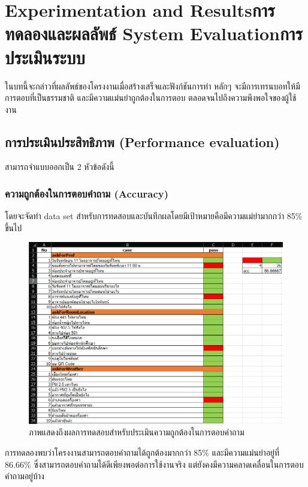 \chapter{\ifproject%
\ifenglish Experimentation and Results\else การทดลองและผลลัพธ์\fi
\else%
\ifenglish System Evaluation\else การประเมินระบบ\fi
\fi}

ในบทนี้จะกล่าวที่ผลลัพธ์ของโครงงานเมื่อสร้างเสร็จและฟังก์ชันการทำ หลักๆ จะมีการเทรนบอทให้มี
การตอบที่เป็นธรรมชาติ และมีความแม่นยำถูกต้องในการตอบ ตลอดจนไปถึงความพึงพอใจของผู้ใช้งาน
\section{การประเมินประสิทธิภาพ (Performance evaluation)}
สามารถจำแบบออกเป็น 2 หัวข้อดังนี้
\subsection{ความถูกต้องในการตอบคำถาม (Accuracy)}
โดยจะจัดทำ data set สำหรับการทดสอบและบันทึกผลโดยมีเป้าหมายคือมีความแม่ยำมากกว่า 85\% ขึ้นไป

\begin{figure}[hbt!]
  \begin{center}
    \includegraphics[width=\textwidth,keepaspectratio]{pic/eval_bot_accuracy.png}
  \end{center}
  \caption{ภาพแสดงถึงผลการทดสอบสำหรับประเมินความถูกต้องในการตอบคําถาม}
  \label{fig:eval_bot_accuracy}
\end{figure}

การทดลองพบว่าโครงงานสามารถตอบคำถามได้ถูกต้องมากกว่า 85\% และมีความแม่นยำอยู่ที่ 86.66\% ซึ่งสามารถตอบคำถามได้ดีเพียงพอต่อการใช้งานจริง
แต่ยังคงมีความคลาดเคลื่อนในการตอบคำถามอยู่บ้าง
